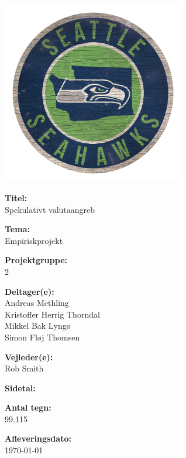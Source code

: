 \begin{center}
   \includegraphics[width=0.6\textwidth]{Example-project/billeder/logo sea circle.jpg}
\end{center}

\vspace{1cm}

\textbf{Titel:}\\
Spekulativt valutaangreb

\textbf{Tema:}\\
Empiriskprojekt

\textbf{Projektgruppe:}\\
2

\textbf{Deltager(e):}\\
Andreas Methling\\
Kristoffer Herrig Thorndal \\
Mikkel Bak Lyngø\\
Simon Fløj Thomsen

\textbf{Vejleder(e):}\\
Rob Smith

\textbf{Sidetal: \pageref{LastPage}}

\textbf{Antal tegn:}\\
99.115

\textbf{Afleveringsdato:}\\
\today
\clearpage